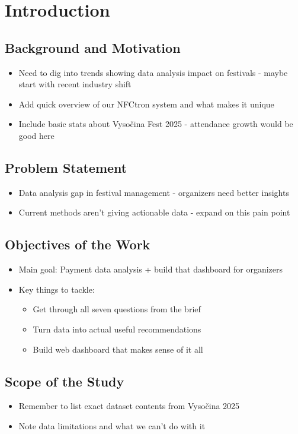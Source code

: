 \chapter*{Introduction}
\label{chap:introduction}


\section*{Background and Motivation}
\label{sec:introduction-background-motivation}
\begin{itemize}
    \item Need to dig into trends showing data analysis impact on festivals - maybe start with recent industry shift
    \item Add quick overview of our NFCtron system and what makes it unique
    \item Include basic stats about Vysočina Fest 2025 - attendance growth would be good here
\end{itemize}


\section*{Problem Statement}
\label{sec:introduction-problem-statement}
\begin{itemize}
    \item Data analysis gap in festival management - organizers need better insights
    \item Current methods aren't giving actionable data - expand on this pain point
\end{itemize}


\section*{Objectives of the Work}
\label{sec:introduction-objectives}
\begin{itemize}
    \item Main goal: Payment data analysis + build that dashboard for organizers
    \item Key things to tackle:
    \begin{itemize}
        \item Get through all seven questions from the brief
        \item Turn data into actual useful recommendations
        \item Build web dashboard that makes sense of it all
    \end{itemize}
\end{itemize}


\section*{Scope of the Study}
\label{sec:introduction-scope}
\begin{itemize}
    \item Remember to list exact dataset contents from Vysočina 2025
    \item Note data limitations and what we can't do with it
\end{itemize}

